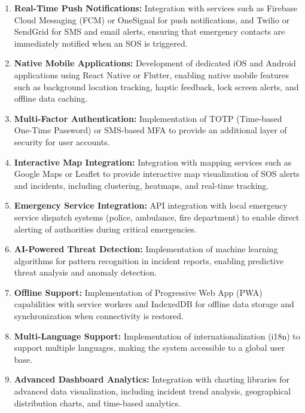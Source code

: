 \begin{enumerate}[label=\textbf{F\arabic*.}]
  \item \textbf{Real-Time Push Notifications:} Integration with services such as Firebase Cloud Messaging (FCM) or OneSignal for push notifications, and Twilio or SendGrid for SMS and email alerts, ensuring that emergency contacts are immediately notified when an SOS is triggered.

  \item \textbf{Native Mobile Applications:} Development of dedicated iOS and Android applications using React Native or Flutter, enabling native mobile features such as background location tracking, haptic feedback, lock screen alerts, and offline data caching.

  \item \textbf{Multi-Factor Authentication:} Implementation of TOTP (Time-based One-Time Password) or SMS-based MFA to provide an additional layer of security for user accounts.

  \item \textbf{Interactive Map Integration:} Integration with mapping services such as Google Maps or Leaflet to provide interactive map visualization of SOS alerts and incidents, including clustering, heatmaps, and real-time tracking.

  \item \textbf{Emergency Service Integration:} API integration with local emergency service dispatch systems (police, ambulance, fire department) to enable direct alerting of authorities during critical emergencies.

  \item \textbf{AI-Powered Threat Detection:} Implementation of machine learning algorithms for pattern recognition in incident reports, enabling predictive threat analysis and anomaly detection.

  \item \textbf{Offline Support:} Implementation of Progressive Web App (PWA) capabilities with service workers and IndexedDB for offline data storage and synchronization when connectivity is restored.

  \item \textbf{Multi-Language Support:} Implementation of internationalization (i18n) to support multiple languages, making the system accessible to a global user base.

  \item \textbf{Advanced Dashboard Analytics:} Integration with charting libraries for advanced data visualization, including incident trend analysis, geographical distribution charts, and time-based analytics.


\end{enumerate}
